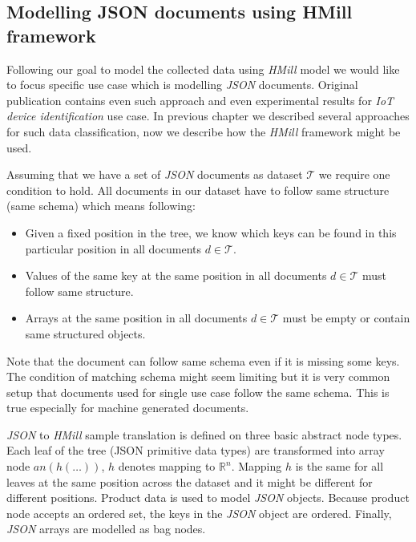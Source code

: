 
\subsection{Modelling JSON documents using HMill framework}
Following our goal to model the collected data using \emph{HMill} model we would like to focus specific use case which is modelling \emph{JSON} documents. Original publication \cite{Mandlik2020} contains even such approach and even experimental results for \emph{IoT device identification} use case. In previous chapter we described several approaches for such data classification, now we describe how the \emph{HMill} framework might be used.

Assuming that we have a set of \emph{JSON} documents as dataset $\mathcal{T}$ we require one condition to hold. All documents in our dataset have to follow same structure (same schema) which means following:
\begin{itemize}
    \item Given a fixed position in the tree, we know which keys can be found in this particular position in all documents $d\in\mathcal{T}$.
    \item Values of the same key at the same position in all documents $d\in\mathcal{T}$ must follow same structure.
    \item Arrays at the same position in all documents $d\in\mathcal{T}$ must be empty or contain same structured objects.
\end{itemize}

Note that the document can follow same schema even if it is missing some keys. The condition of matching schema might seem limiting but it is very common setup that documents used for single use case follow the same schema. This is true especially for machine generated documents.

\emph{JSON} to \emph{HMill} sample translation is defined on three basic abstract node types. Each leaf of the tree (JSON primitive data types) are transformed into array node $an(h(\dots))$, $h$ denotes mapping to $\mathbb{R}^n$. Mapping $h$ is the same for all leaves at the same position across the dataset and it might be different for different positions. Product data is used to model \emph{JSON} objects. Because product node accepts an ordered set, the keys in the \emph{JSON} object are ordered. Finally, \emph{JSON} arrays are modelled as bag nodes.

